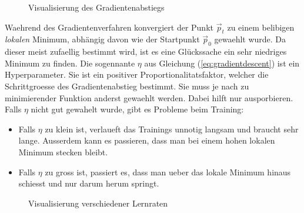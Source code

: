\begin{figure}[h!]
  \centering

  \caption{Visualisierung des Gradientenabstiegs}
\end{figure}

Waehrend des Gradientenverfahren konvergiert der Punkt $\vec{p}_t$ zu einem belibigen \textit{lokalen} Minimum, abhängig davon wie der Startpunkt $\vec{p}_0$ gewaehlt wurde.
Da dieser meist zufaellig bestimmt wird, ist es eine Glückssache ein sehr niedriges Minimum zu finden.
\para{}
Die sogennante  $\eta$ aus Gleichung (\ref{eq:gradientdescent}) ist ein Hyperparameter.
Sie ist ein positiver Proportionalitatsfaktor, welcher die Schrittgroesse des Gradientenabstieg bestimmt. Sie muss je nach zu minimierender Funktion anderst gewaehlt werden.
Dabei hilft nur ausporbieren. Falls $\eta$ nicht gut gewahelt wurde, gibt es Probleme beim Training:
\begin{itemize}
\item{Falls $\eta$ zu klein ist, verlaueft das Trainings unnotig langsam und braucht sehr lange.
    Ausserdem kann es passieren, dass man bei einem hohen lokalen Minimum stecken bleibt.}

\item{Falls $\eta$ zu gross ist, passiert es, dass man ueber das lokale Minimum hinaus schiesst und nur darum herum springt.}
\end{itemize}

\begin{figure}[h!]
  \centering
  \caption{Visualisierung verschiedener Lernraten}
\end{figure}





